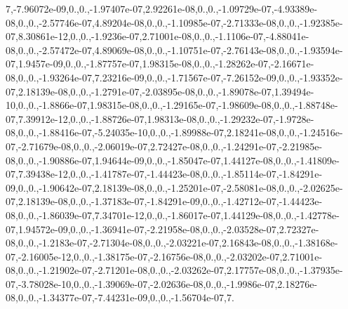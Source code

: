 \begin{DoxyCompactItemize}
7,-\/7.\-96072e-\/09,0.,0.,-\/1.\-97407e-\/07,2.\-92261e-\/08,0.,0.,-\/1.\-09729e-\/07,-\/4.\-93389e-\/08,0.,0.,-\/2.\-57746e-\/07,4.\-89204e-\/08,0.,0.,-\/1.\-10985e-\/07,-\/2.\-71333e-\/08,0.,0.,-\/1.\-92385e-\/07,8.\-30861e-\/12,0.,0.,-\/1.\-9236e-\/07,2.\-71001e-\/08,0.,0.,-\/1.\-1106e-\/07,-\/4.\-88041e-\/08,0.,0.,-\/2.\-57472e-\/07,4.\-89069e-\/08,0.,0.,-\/1.\-10751e-\/07,-\/2.\-76143e-\/08,0.,0.,-\/1.\-93594e-\/07,1.\-9457e-\/09,0.,0.,-\/1.\-87757e-\/07,1.\-98315e-\/08,0.,0.,-\/1.\-28262e-\/07,-\/2.\-16671e-\/08,0.,0.,-\/1.\-93264e-\/07,7.\-23216e-\/09,0.,0.,-\/1.\-71567e-\/07,-\/7.\-26152e-\/09,0.,0.,-\/1.\-93352e-\/07,2.\-18139e-\/08,0.,0.,-\/1.\-2791e-\/07,-\/2.\-03895e-\/08,0.,0.,-\/1.\-89078e-\/07,1.\-39494e-\/10,0.,0.,-\/1.\-8866e-\/07,1.\-98315e-\/08,0.,0.,-\/1.\-29165e-\/07,-\/1.\-98609e-\/08,0.,0.,-\/1.\-88748e-\/07,7.\-39912e-\/12,0.,0.,-\/1.\-88726e-\/07,1.\-98313e-\/08,0.,0.,-\/1.\-29232e-\/07,-\/1.\-9728e-\/08,0.,0.,-\/1.\-88416e-\/07,-\/5.\-24035e-\/10,0.,0.,-\/1.\-89988e-\/07,2.\-18241e-\/08,0.,0.,-\/1.\-24516e-\/07,-\/2.\-71679e-\/08,0.,0.,-\/2.\-06019e-\/07,2.\-72427e-\/08,0.,0.,-\/1.\-24291e-\/07,-\/2.\-21985e-\/08,0.,0.,-\/1.\-90886e-\/07,1.\-94644e-\/09,0.,0.,-\/1.\-85047e-\/07,1.\-44127e-\/08,0.,0.,-\/1.\-41809e-\/07,7.\-39438e-\/12,0.,0.,-\/1.\-41787e-\/07,-\/1.\-44423e-\/08,0.,0.,-\/1.\-85114e-\/07,-\/1.\-84291e-\/09,0.,0.,-\/1.\-90642e-\/07,2.\-18139e-\/08,0.,0.,-\/1.\-25201e-\/07,-\/2.\-58081e-\/08,0.,0.,-\/2.\-02625e-\/07,2.\-18139e-\/08,0.,0.,-\/1.\-37183e-\/07,-\/1.\-84291e-\/09,0.,0.,-\/1.\-42712e-\/07,-\/1.\-44423e-\/08,0.,0.,-\/1.\-86039e-\/07,7.\-34701e-\/12,0.,0.,-\/1.\-86017e-\/07,1.\-44129e-\/08,0.,0.,-\/1.\-42778e-\/07,1.\-94572e-\/09,0.,0.,-\/1.\-36941e-\/07,-\/2.\-21958e-\/08,0.,0.,-\/2.\-03528e-\/07,2.\-72327e-\/08,0.,0.,-\/1.\-2183e-\/07,-\/2.\-71304e-\/08,0.,0.,-\/2.\-03221e-\/07,2.\-16843e-\/08,0.,0.,-\/1.\-38168e-\/07,-\/2.\-16005e-\/12,0.,0.,-\/1.\-38175e-\/07,-\/2.\-16756e-\/08,0.,0.,-\/2.\-03202e-\/07,2.\-71001e-\/08,0.,0.,-\/1.\-21902e-\/07,-\/2.\-71201e-\/08,0.,0.,-\/2.\-03262e-\/07,2.\-17757e-\/08,0.,0.,-\/1.\-37935e-\/07,-\/3.\-78028e-\/10,0.,0.,-\/1.\-39069e-\/07,-\/2.\-02636e-\/08,0.,0.,-\/1.\-9986e-\/07,2.\-18276e-\/08,0.,0.,-\/1.\-34377e-\/07,-\/7.\-44231e-\/09,0.,0.,-\/1.\-56704e-\/07,7.
\end{DoxyCompactItemize}
